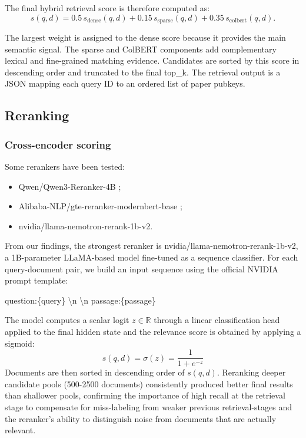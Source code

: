 The final hybrid retrieval score is therefore computed as:
\[
    s(q, d) =
    0.5\,s_{\text{dense}}(q, d)
    + 0.15\,s_{\text{sparse}}(q, d)
    + 0.35\,s_{\text{colbert}}(q, d).
\]

The largest weight is assigned to the dense score because it provides the main semantic signal. The sparse and ColBERT components add complementary lexical and fine-grained matching evidence. Candidates are sorted by this score in descending order and truncated to the final top\_k. The retrieval output is a JSON mapping each query ID to an ordered list of paper pubkeys.


\subsection{Reranking} \label{sub:reranking}
\subsubsection{Cross-encoder scoring}
Some rerankers have been tested:
\begin{itemize}
    \item Qwen/Qwen3-Reranker-4B \cite{qwen3embedding};
    \item Alibaba-NLP/gte-reranker-modernbert-base \cite{zhang2024mgte, li2023towards};
    \item nvidia/llama-nemotron-rerank-1b-v2\cite{llama-nemotron-rerank-1b-v2}.
\end{itemize}
 
From our findings, the strongest reranker is nvidia/llama-nemotron-rerank-1b-v2, a 1B-parameter LLaMA-based model fine-tuned as a sequence classifier. For each query-document pair, we build an input sequence using the official NVIDIA prompt template:
\begin{promptbox}
    \small\ttfamily
    question:\{query\} \textbackslash n \textbackslash n passage:\{passage\}
\end{promptbox}
The model computes a scalar logit $z \in \mathbb{R}$ through a linear classification head applied to the final hidden state and the relevance score is obtained by applying a sigmoid:
\[
    s(q, d) = \sigma(z) = \frac{1}{1 + e^{-z}}
\]
Documents are then sorted in descending order of $s(q, d)$.
Reranking deeper candidate pools (500-2500 documents) consistently produced better final results than shallower pools, confirming the importance of high recall at the retrieval stage to compensate for miss-labeling from weaker previous retrieval-stages and the reranker's ability to distinguish noise from documents that are actually relevant. 

